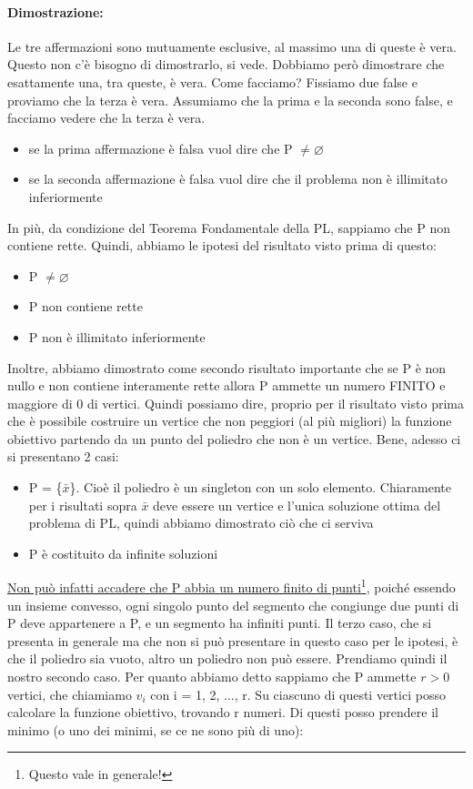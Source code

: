 \paragraph{Dimostrazione:} Le tre affermazioni sono mutuamente esclusive, al massimo una di queste è vera. Questo non c'è bisogno di dimostrarlo, si vede. Dobbiamo però dimostrare che esattamente una, tra queste, è vera. Come facciamo? Fissiamo due false e proviamo che la terza è vera. Assumiamo che la prima e la seconda sono false, e facciamo vedere che la terza è vera.
\begin{itemize}
    \item se la prima affermazione è falsa vuol dire che P $\neq \varnothing$
    \item se la seconda affermazione è falsa vuol dire che il problema non è illimitato inferiormente
\end{itemize}
In più, da condizione del Teorema Fondamentale della PL, sappiamo che P non contiene rette. Quindi, abbiamo le ipotesi del risultato visto prima di questo:
\begin{itemize}
    \item P $\neq \varnothing$
    \item P non contiene rette
    \item P non è illimitato inferiormente
\end{itemize}
Inoltre, abbiamo dimostrato come secondo risultato importante che se P è non nullo e non contiene interamente rette allora P ammette un numero FINITO e maggiore di 0 di vertici. Quindi possiamo dire, proprio per il risultato visto prima che è possibile costruire un vertice che non peggiori (al più migliori) la funzione obiettivo partendo da un punto del poliedro che non è un vertice. Bene, adesso ci si presentano 2 casi:
\begin{itemize}
    \item P = \{$\bar{x}$\}. Cioè il poliedro è un singleton con un solo elemento. Chiaramente per i risultati sopra $\bar{x}$ deve essere un vertice e l'unica soluzione ottima del problema di PL, quindi abbiamo dimostrato ciò che ci serviva
    \item P è costituito da infinite soluzioni
\end{itemize}
\underline{Non può infatti accadere che P abbia un numero finito di punti}\footnote{Questo vale in generale!}, poiché essendo un insieme convesso, ogni singolo punto del segmento che congiunge due punti di P deve appartenere a P, e un segmento ha infiniti punti. Il terzo caso, che si presenta in generale ma che non si può presentare in questo caso per le ipotesi, è che il poliedro sia vuoto, altro un poliedro non può essere. Prendiamo quindi il nostro secondo caso. Per quanto abbiamo detto sappiamo che P ammette $r > 0$ vertici, che chiamiamo $v_i$ con i = 1, 2, ..., r. Su ciascuno di questi vertici posso calcolare la funzione obiettivo, trovando r numeri. Di questi posso prendere il minimo (o uno dei minimi, se ce ne sono più di uno):
